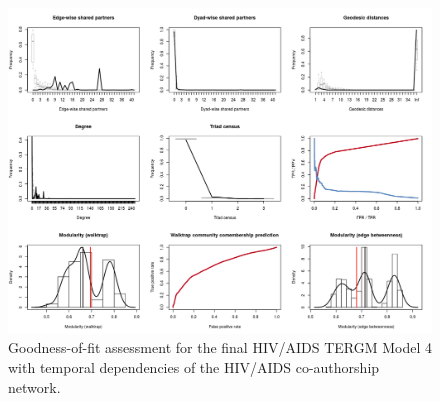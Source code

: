 \begin{figure}
\centering
\includegraphics[scale=0.65]{Chapters/hiv/statMod/tergm_gof}
\caption{Goodness-of-fit assessment for the final HIV/AIDS TERGM Model 4 with temporal dependencies of the HIV/AIDS co-authorship network.}
\label{fig:hiv_tergm-gof}
\end{figure}

\pagebreak
